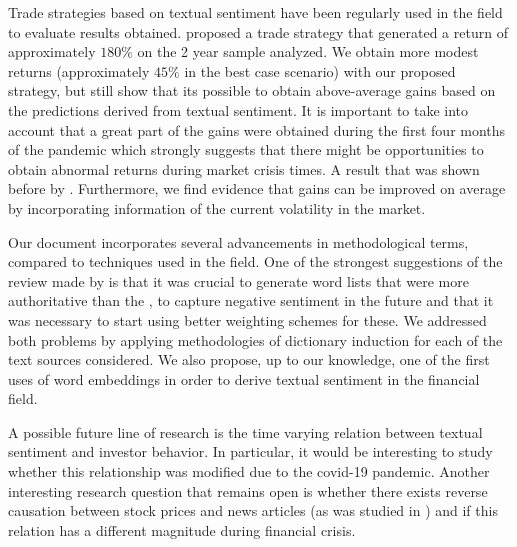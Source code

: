 \documentclass[a4paper, 12pt]{report}
\begin{document}
    Trade strategies based on textual sentiment have been regularly used in the field to evaluate results obtained. \textcite{Engelberg:2012} proposed a trade strategy that generated a return of approximately $180\%$ on the 2 year sample analyzed. We obtain more modest returns (approximately $45\%$ in the best case scenario) with our proposed strategy, but still show that its possible to obtain above-average gains based on the predictions derived from textual sentiment. It is important to take into account that a great part of the gains were obtained during the first four months of the pandemic which strongly suggests that there might be opportunities to obtain abnormal returns during market crisis times. A result that was shown before by \textcite{Garcia:2013}. Furthermore, we find evidence that gains can be improved on average by incorporating information of the current volatility in the market. 
    
    Our document incorporates several advancements in methodological terms, compared to techniques used in the field. One of the strongest suggestions of the review made by \textcite{Kearney:2014} is that it was crucial to generate word lists that were more authoritative than the \textcite{Loughran:2011}, to capture negative sentiment in the future and that it was necessary to start using better weighting schemes for these. We addressed both problems by applying methodologies of dictionary induction for each of the text sources considered. We also propose, up to our knowledge, one of the first uses of word embeddings in order to derive textual sentiment in the financial field. 
    
    A possible future line of research is the time varying relation between textual sentiment and investor behavior. In particular, it would be interesting to study whether this relationship was  modified due to the covid-19 pandemic. Another interesting research question that remains open is whether there exists reverse causation between stock prices and news articles (as was studied in \textcite{Garcia:2013}) and if this relation has a different magnitude during financial crisis. 

    
\end{document}
